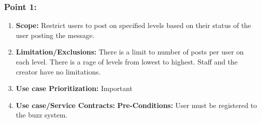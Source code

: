 \documentclass[11pt]{article}
\begin{document}
\subsubsection{Point 1:}
\begin{enumerate}
	
		\item
		\textbf{Scope:}
		\newline
		Restrict users to post on specified levels based on their status of the user posting the message.
		\item\textbf{Limitation/Exclusions: }
		\newline
		 There is a limit to number of posts per user on each level.
		 There is a rage of levels from lowest to highest.
		 Staff and the creator have no limitations.
		\item\textbf{Use case Prioritization:} 
		\newline Important
		\item \textbf{Use case/Service Contracts:} 
		\newline\newline
		\textbf{Pre-Conditions: }
		\newline
		 User must be registered to the buzz system.
	

\end{enumerate}
\end{document}

